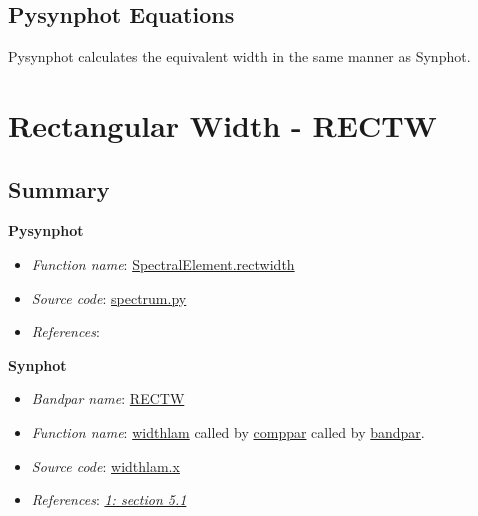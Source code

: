 \documentclass[letterpaper,10pt,english]{sphinxtsr}
\begin{document}
\section{Pysynphot Equations}
\label{main:id8}
Pysynphot calculates the equivalent width in the same manner as Synphot.


\chapter{Rectangular Width - RECTW}
\label{main:rectangular-width-rectw}

\section{Summary}
\label{main:id9}
\textbf{Pysynphot}
\begin{itemize}
\item {} 
\emph{Function name}: \href{https://trac.assembla.com/astrolib/browser/trunk/pysynphot/lib/pysynphot/spectrum.py\#L1109}{SpectralElement.rectwidth}

\item {} 
\emph{Source code}: \href{https://trac.assembla.com/astrolib/browser/trunk/pysynphot/lib/pysynphot/spectrum.py}{spectrum.py}

\item {} 
\emph{References}:

\end{itemize}

\textbf{Synphot}
\begin{itemize}
\item {} 
\emph{Bandpar name}: \href{https://svn.stsci.edu/trac/ssb/stsci\_python/browser/stsdas/trunk/stsdas/pkg/hst\_calib/synphot/doc/bandpar.hlp}{RECTW}

\item {} 
\emph{Function name}: \href{https://svn.stsci.edu/trac/ssb/stsci\_python/browser/stsdas/trunk/stsdas/pkg/hst\_calib/synphot/newlib/widthlam.x}{widthlam}
called by \href{https://svn.stsci.edu/trac/ssb/stsci\_python/browser/stsdas/trunk/stsdas/pkg/hst\_calib/synphot/bandpar/comppar.x}{comppar} called by \href{https://svn.stsci.edu/trac/ssb/stsci\_python/browser/stsdas/trunk/stsdas/pkg/hst\_calib/synphot/bandpar/bandpar.x}{bandpar}.

\item {} 
\emph{Source code}: \href{https://svn.stsci.edu/trac/ssb/stsci\_python/browser/stsdas/trunk/stsdas/pkg/hst\_calib/synphot/newlib/widthlam.x}{widthlam.x}

\item {} 
\emph{References}: {\hyperref[references:ref1]{\emph{1: section 5.1}}}

\end{itemize}
\end{document}
